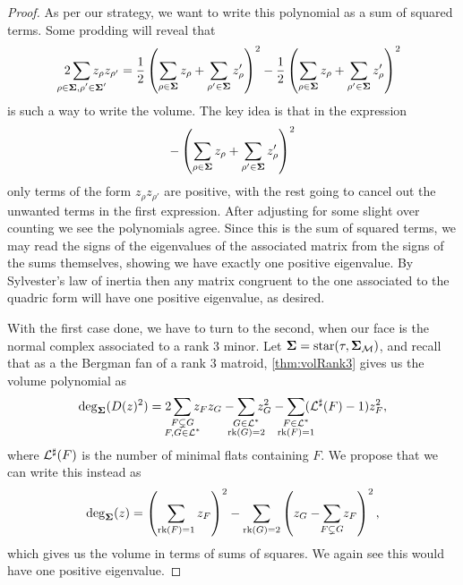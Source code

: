 \documentclass[12pt,oneside]{../../sfsuthesis}
\begin{document}
\begin{proof}
    As per our strategy, we want to write this polynomial as a sum of squared terms.
    Some prodding will reveal that
    \[
        2\sum_{\mathclap{\rho \in \bSigma, \rho' \in \bSigma'}} z_{\rho}z_{\rho'}
        = \frac{1}{2} \left( \sum_{\rho \in \bSigma} z_\rho  + \sum_{\rho' \in \bSigma} z_\rho' \right)^2 - \frac{1}{2} \left( \sum_{\rho \in \bSigma} z_\rho  + \sum_{\rho' \in \bSigma} z_\rho' \right)^2
    \]
    is such a way to write the volume.
    The key idea is that in the expression
    \[
        -\left( \sum_{\rho \in {\bm{\Sigma}}} z_\rho  + \sum_{\rho' \in {\bm{\Sigma}}} z_\rho' \right)^2
    \]
    only terms of the form \( z_\rho z_{\rho'} \) are positive, with the rest going to cancel out the unwanted terms in the first expression.
    After adjusting for some slight over counting we see the polynomials agree.
    Since this is the sum of squared terms, we may read the signs of the eigenvalues of the associated matrix from the signs of the sums themselves, showing we have exactly one positive eigenvalue.
    By Sylvester's law of inertia then any matrix congruent to the one associated to the quadric form will have one positive eigenvalue, as desired.

    With the first case done, we have to turn to the second, when our face is the normal complex associated to a rank 3 minor.
    Let \( {\bm{\Sigma}} = \operatorname{star}(\tau, {\bm{\Sigma}}_{\mathcal{M}})  \), and recall that as a the Bergman fan of a rank 3 matroid, \th\ref{thm:volRank3} gives us the volume polynomial as
    \[
        \deg_\bSigma(D(z)^2) =  2\sum_{\mathclap{\substack{F \subsetneq G \\ F,G \in \cL^\ast}}} z_F z_G - \sum_{\mathclap{\substack{G \in \cL^\ast \\ \rk(G)=2}}} z_G^2 - \sum_{\mathclap{\substack{F \in \cL^\ast \\ \rk(F)=1}}}(\cL^\sharp(F) - 1)z_F^2,
    \]
    where \( \mathcal{L}^\sharp(F) \) is the number of minimal flats containing \( F \).
    We propose that we can write this instead as
    \[
        \deg_\bSigma(z) = \left( \sum_{\rk(F) = 1} z_F\right)^2 - \sum_{\substack{\rk(G) = 2}} \left( z_G - \sum_{\mathclap{\substack{F \subsetneq G }}} z_F\right)^2,
    \]
    which gives us the volume in terms of sums of squares.
    We again see this would have one positive eigenvalue.


\end{proof}
\end{document}
